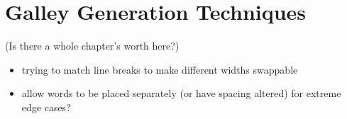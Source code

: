 \chapter{Galley Generation Techniques}\label{ch:galleys}


(Is there a whole chapter's worth here?)

\begin{itemize}
 \item trying to match line breaks to make different widths swappable
 \item allow words to be placed separately (or have spacing altered) for extreme edge cases?
\end{itemize}


